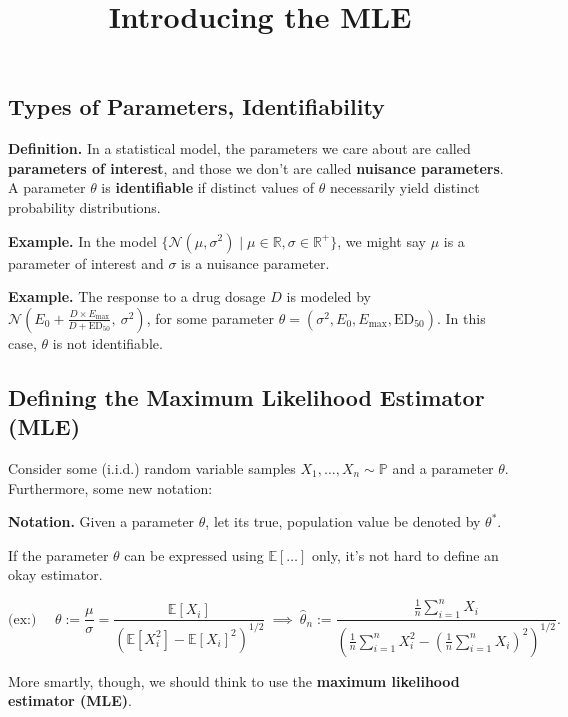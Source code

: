 \title{Introducing the MLE}



\subsection{Types of Parameters, Identifiability}

\textbf{Definition.} In a statistical model,
the parameters we care about are called \textbf{parameters of interest},
and those we don't are called \textbf{nuisance parameters}.
A parameter $\theta$ is \textbf{identifiable} if
distinct values of $\theta$ necessarily yield distinct probability distributions.

\textbf{Example.} In the model
$\{\mathcal{N}(\mu, \sigma^2) \mid \mu \in \mathbb{R}, \sigma \in \mathbb{R}^+\}$,
we might say $\mu$ is a parameter of interest and $\sigma$ is a nuisance parameter.

\textbf{Example.} The response to a drug dosage $D$ is modeled by
$\mathcal{N}\left(E_0 + \frac{D \times E_{\text{max}}}{D + \mathrm{ED}_{50}},\ \sigma^2\right)$,
for some parameter $\theta = (\sigma^2, E_0, E_{\text{max}}, \mathrm{ED}_{50})$.
In this case, $\theta$ is not identifiable.

\subsection{Defining the Maximum Likelihood Estimator (MLE)}

Consider some (i.i.d.) random variable samples $X_1, \dots, X_n \sim \mathbb{P}$
and a parameter $\theta$.  Furthermore, some new notation:

\textbf{Notation.} Given a parameter $\theta$,
let its true, population value be denoted by $\theta^*$.

If the parameter $\theta$ can be expressed using $\mathbb{E}[\dots]$ only,
it's not hard to define an okay estimator.

\[ \text{(ex:)} ~~~~~~ \theta := \frac{\mu}{\sigma} =
\frac{\mathbb{E}[X_i]}{(\mathbb{E}[X_i^2] - \mathbb{E}[X_i]^2)^{1/2}} ~ \implies ~ \hat{\theta}_n :=
\frac{\frac{1}{n}\sum_{i = 1}^n X_i}{\left(
\frac{1}{n}\sum_{i = 1}^n X_i^2 - \left(\frac{1}{n}\sum_{i = 1}^n X_i\right)^2
\right)^{1/2}}. \]

More smartly, though, we should think to use the \textbf{maximum likelihood estimator (MLE)}.

